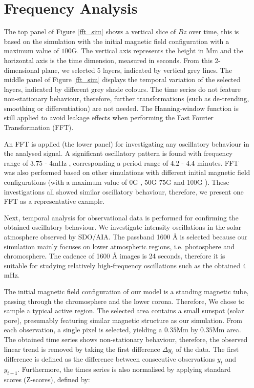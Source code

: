 \documentclass[linenumbers]{aastex63}
\begin{document}
\section{Frequency Analysis}

The top panel of Figure \ref{fft_sim} shows a vertical slice of $Bz$ over time, this is based on the simulation with the initial magnetic field configuration with a maximum value of $100$G. The vertical axis represents the height in Mm and the horizontal axis is the time dimension, measured in seconds. From this 2-dimensional plane, we selected $5$ layers, indicated by vertical grey lines. The middle panel of Figure \ref{fft_sim} displays the temporal variation of the selected layers, indicated by different grey shade colours. The time series do not feature non-stationary behaviour, therefore, further transformations (such as de-trending, smoothing or differentiation) are not needed. The Hanning-window function is still applied to avoid leakage effects when performing the Fast Fourier Transformation (FFT).  

An FFT is applied (the lower panel) for investigating any oscillatory behaviour in the analysed signal. A significant oscillatory pattern is found with frequency range of $3.75$ - $4$mHz , corresponding a period range of $4.2$ - $4.4$ minutes. FFT was also performed based on other simulations with different initial magnetic field configurations (with a maximum value of $0$G , $50$G  $75$G  and $100$G ). These investigations all showed similar oscillatory behaviour, therefore, we present one FFT as a representative example. 

Next, temporal analysis for observational data is performed for confirming the obtained oscillatory behaviour. We investigate intensity oscillations in the solar atmosphere observed by SDO/AIA. The passband 1600 {\AA} is selected because our simulation mainly focuses on lower atmospheric regions, i.e. photosphere and chromosphere. The cadence of 1600 {\AA} images is 24 seconds, therefore it is suitable for studying relatively high-frequency oscillations such as the obtained $4$mHz.

The initial magnetic field configuration of our model is a standing magnetic tube, passing through the chromosphere and the lower corona. Therefore, We chose to sample a typical active region. The selected area contains a small sunspot (solar pore), presumably featuring similar magnetic structure as our simulation. From each observation, a single pixel is selected, yielding a $0.35$Mm  by $0.35$Mm  area. The obtained time series shows non-stationary behaviour, therefore, the observed linear trend is removed by taking the first difference $\Delta  y_{t}$ of the data. The first difference is defined as the difference between consecutive observations $y_{t}$ and $y_{t-1}$. Furthermore, the times series is also normalised by applying standard scores (Z-scores), defined by:
\end{document}
